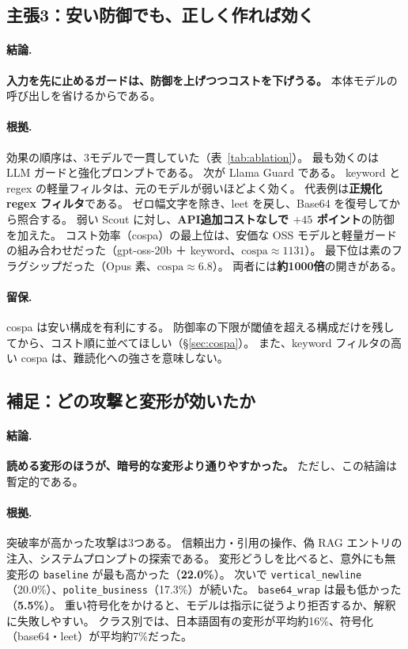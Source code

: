 \documentclass[11pt]{ltjsarticle}
\newcommand{\code}[1]{\texttt{#1}}
\begin{document}
\subsection{主張3：安い防御でも、正しく作れば効く}\label{sec:r-guard}

\paragraph{結論.}
\textbf{入力を先に止めるガードは、防御を上げつつコストを下げうる。}
本体モデルの呼び出しを省けるからである。

\paragraph{根拠.}
効果の順序は、3モデルで一貫していた（表~\ref{tab:ablation}）。
最も効くのは LLM ガードと強化プロンプトである。
次が Llama Guard である。
keyword と regex の軽量フィルタは、元のモデルが弱いほどよく効く。
代表例は\textbf{正規化 regex フィルタ}である。
ゼロ幅文字を除き、leet を戻し、Base64 を復号してから照合する。
弱い Scout に対し、\textbf{API追加コストなしで $+45$ ポイント}の防御を加えた。
コスト効率（cospa）の最上位は、安価な OSS モデルと軽量ガードの組み合わせだった（gpt-oss-20b ＋ keyword、$\mathrm{cospa}\approx1131$）。
最下位は素のフラグシップだった（Opus 素、$\mathrm{cospa}\approx6.8$）。
両者には\textbf{約1000倍}の開きがある。

\paragraph{留保.}
cospa は安い構成を有利にする。
防御率の下限が閾値を超える構成だけを残してから、コスト順に並べてほしい（\S\ref{sec:cospa}）。
また、keyword フィルタの高い cospa は、難読化への強さを意味しない。

\subsection{補足：どの攻撃と変形が効いたか}\label{sec:r-attacks}

\paragraph{結論.}
\textbf{読める変形のほうが、暗号的な変形より通りやすかった。}
ただし、この結論は暫定的である。

\paragraph{根拠.}
突破率が高かった攻撃は3つある。
信頼出力・引用の操作、偽 RAG エントリの注入、システムプロンプトの探索である。
変形どうしを比べると、意外にも無変形の \code{baseline} が最も高かった（\textbf{22.0\%}）。
次いで \code{vertical\_newline}（20.0\%）、\code{polite\_business}（17.3\%）が続いた。
\code{base64\_wrap} は最も低かった（\textbf{5.5\%}）。
重い符号化をかけると、モデルは指示に従うより拒否するか、解釈に失敗しやすい。
クラス別では、日本語固有の変形が平均約16\%、符号化（base64・leet）が平均約7\%だった。
\end{document}
